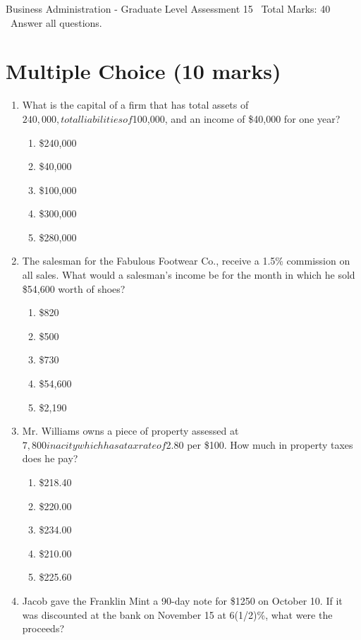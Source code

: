 \documentclass[12pt]{article}
\begin{document}
\begin{center}
Business Administration - Graduate Level Assessment 15 \
Total Marks: 40 \
Answer all questions.
\end{center}

\section*{Multiple Choice (10 marks)}
\begin{enumerate}[label=\arabic*.]
\item What is the capital of a firm that has total assets of $240,000, total liabilities of $100,000, and an income of \$40,000 for one year?
\begin{enumerate}[label=(\alph*)]
    \item \$240,000
    \item \$40,000
    \item \$100,000
    \item \$300,000
    \item \$280,000
\end{enumerate}
\item The salesman for the Fabulous Footwear Co., receive a 1.5\% commission on all sales. What would a salesman's income be for the month in which he sold \$54,600 worth of shoes?
\begin{enumerate}[label=(\alph*)]
    \item \$820
    \item \$500
    \item \$730
    \item \$54,600
    \item \$2,190
\end{enumerate}
\item Mr. Williams owns a piece of property assessed at $7,800 in a city which has a tax rate of $2.80 per \$100. How much in property taxes does he pay?
\begin{enumerate}[label=(\alph*)]
    \item \$218.40
    \item \$220.00
    \item \$234.00
    \item \$210.00
    \item \$225.60
\end{enumerate}
\item Jacob gave the Franklin Mint a 90-day note for \$1250 on October 10. If it was discounted at the bank on November 15 at 6(1/2)\%, what were the proceeds?
\begin{enumerate}[label=(\alph*)]

\end{enumerate}
\end{enumerate}
\end{document}
